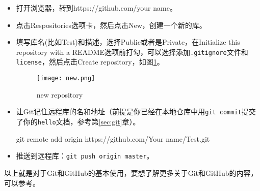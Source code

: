 \documentclass[a4paper,12pt]{article}
\begin{document}
\begin{itemize}
\item 打开浏览器，转到https://github.com/your name。
\item 点击Respositories选项卡，然后点击New，创建一个新的库。
\item 填写库名(比如Test)和描述，选择Public或者是Private，在Initialize this repository with a README选项前打勾，可以选择添加\verb|.gitignore|文件和\verb|license|，然后点击Create repository，如图\ref{fig:1}。
\begin{figure}[!htb] %
\centering
\texttt{[image: new.png]}
\caption{new repository}\label{fig:1}
\end{figure}
\item 让Git记住远程库的名和地址（前提是你已经在本地仓库中用\lstinline|git commit|提交了你的\verb|hello|文档，参考第\ref{sec:git}章）。
\begin{bash}
git remote add origin https://github.com/Your name/Test.git
\end{bash}
\item 推送到远程库：\lstinline|git push origin master|。
\end{itemize}

以上就是对于Git和GitHub的基本使用，要想了解更多关于Git和GitHub的内容，可以参考\cite{1:misc}\cite{3:misc}。


\end{document}
